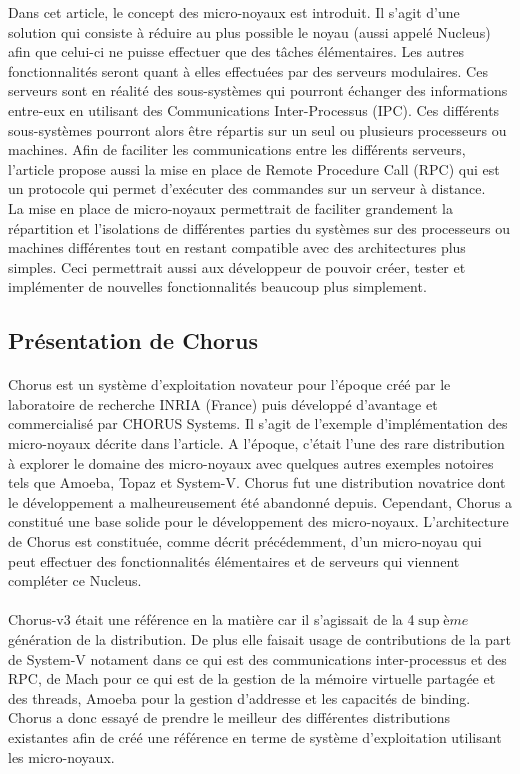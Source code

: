 \documentclass[a4paper, 12pt]{article}
\begin{document}
Dans cet article, le concept des micro-noyaux est introduit. Il s'agit d'une solution qui consiste à réduire au plus possible le noyau (aussi appelé Nucleus) afin que celui-ci ne puisse effectuer que des tâches élémentaires. Les autres fonctionnalités seront quant à elles effectuées par des serveurs modulaires. Ces serveurs sont en réalité des sous-systèmes qui pourront échanger des informations entre-eux en utilisant des Communications Inter-Processus (IPC). Ces différents sous-systèmes pourront alors être répartis sur un seul ou plusieurs processeurs ou machines. Afin de faciliter les communications entre les différents serveurs, l'article propose aussi la mise en place de Remote Procedure Call (RPC) qui est un protocole qui permet d'exécuter des commandes sur un serveur à distance. \\
La mise en place de micro-noyaux permettrait de faciliter grandement la répartition et l'isolations de différentes parties du systèmes sur des processeurs ou machines différentes tout en restant compatible avec des architectures plus simples. Ceci permettrait aussi aux développeur de pouvoir créer, tester et implémenter de nouvelles fonctionnalités beaucoup plus simplement.

\subsection{Présentation de Chorus}
\paragraph{}
Chorus est un système d'exploitation novateur pour l'époque créé par le laboratoire de recherche INRIA (France) puis développé d'avantage et commercialisé par CHORUS Systems. Il s'agit de l'exemple d'implémentation des micro-noyaux décrite dans l'article. A l'époque, c'était l'une des rare distribution à explorer le domaine des micro-noyaux avec quelques autres exemples notoires tels que Amoeba, Topaz et System-V. Chorus fut une distribution novatrice dont le développement a malheureusement été abandonné depuis. Cependant, Chorus a constitué une base solide pour le développement des micro-noyaux. L'architecture de Chorus est constituée, comme décrit précédemment, d'un micro-noyau qui peut effectuer des fonctionnalités élémentaires et de serveurs qui viennent compléter ce Nucleus.
\\
\paragraph{}
Chorus-v3 était une référence en la matière car il s'agissait de la 4$\sup{ème}$ génération de la distribution. De plus elle faisait usage de contributions de la part de System-V notament dans ce qui est des communications inter-processus et des RPC, de Mach pour ce qui est de la gestion de la mémoire virtuelle partagée et des threads, Amoeba pour la gestion d'addresse et les capacités de binding. Chorus a donc essayé de prendre le meilleur des différentes distributions existantes afin de créé une référence en terme de système d'exploitation utilisant les micro-noyaux.
\\
\end{document}
